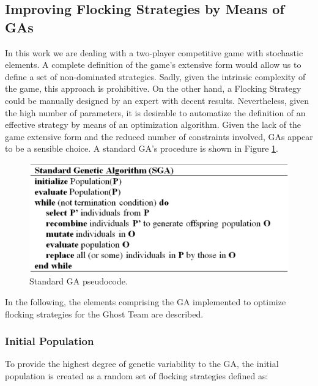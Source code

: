 \documentclass{llncs}
\begin{document}
\subsection{Improving Flocking Strategies by Means of GAs}
\label{subsec:GAs_flocking}

In this work we are dealing with a two-player competitive game with stochastic elements. A complete definition of the game's extensive form would allow us to define a set of non-dominated strategies. Sadly, given the intrinsic complexity of the game, this approach is prohibitive. On the other hand, a Flocking Strategy could be manually designed by an expert with decent results. Nevertheless, given the high number of parameters, it is desirable to automatize the definition of an effective strategy by means of an optimization algorithm. Given the lack of the game extensive form and the reduced number of constraints involved, GAs appear to be a sensible choice. A standard GA's procedure is shown in Figure \ref{fig:GA_pseudocode}.

\begin{figure}[ht]
	\begin{center}
		\includegraphics[scale=0.45]{img/GA_pseudocode.eps}
		\caption{Standard GA pseudocode.
		\label{fig:GA_pseudocode}}
	\end{center}
\end{figure}

In the following, the elements comprising the GA implemented to optimize flocking strategies for the Ghost Team are described.

\subsubsection{Initial Population}
\label{par:GA_Initial}

To provide the highest degree of genetic variability to the GA, the initial population is created as a random set of flocking strategies defined as:
\end{document}
